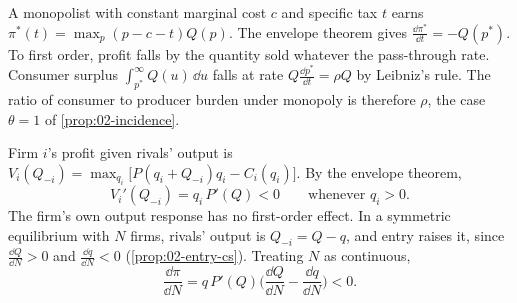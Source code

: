 \begin{example}\label{ex:B-monopoly-tax}
A monopolist with constant marginal cost $c$ and specific tax $t$ earns $\pi^*(t) = \max_p(p - c - t)Q(p)$. The envelope
theorem gives $\frac{\dd \pi^*}{\dd t} = -Q(p^*)$. To first order, profit falls by the quantity sold whatever the
pass-through rate. Consumer surplus $\int_{p^*}^{\infty}Q(u)\,\dd u$ falls at rate $Q\frac{\dd p^*}{\dd t} = \rho Q$ by Leibniz's
rule. The ratio of consumer to producer burden under monopoly is therefore $\rho$, the case $\theta = 1$ of
\cref{prop:02-incidence}.
\end{example}

\begin{example}\label{ex:B-cournot-entry}
Firm $i$'s profit given rivals' output is $V_i(Q_{-i}) = \max_{q_i}\big[P(q_i + Q_{-i})q_i - C_i(q_i)\big]$. By the envelope
theorem,
\begin{equation*}
V_i'(Q_{-i}) = q_i\,P'(Q) < 0 \qquad\text{whenever } q_i > 0 .
\end{equation*}
The firm's own output response has no first-order effect. In a symmetric equilibrium with $N$ firms, rivals' output is
$Q_{-i} = Q - q$, and entry raises it, since $\frac{\dd Q}{\dd N} > 0$ and $\frac{\dd q}{\dd N} < 0$ (\cref{prop:02-entry-cs}).
Treating $N$ as continuous,
\begin{equation*}
\frac{\dd \pi}{\dd N} = q\,P'(Q)\Big(\frac{\dd Q}{\dd N} - \frac{\dd q}{\dd N}\Big) < 0 .
\end{equation*}
\end{example}

